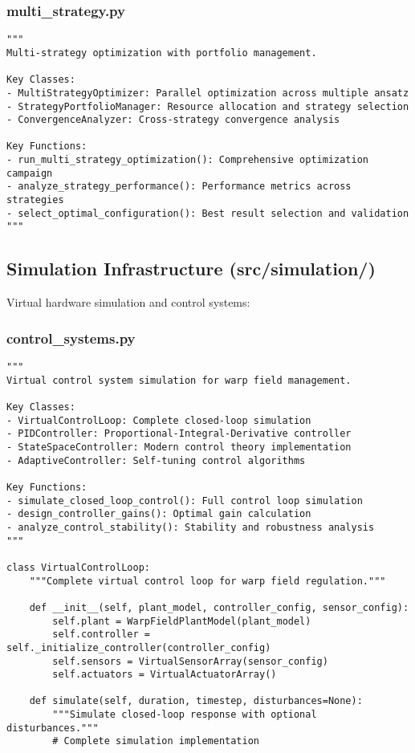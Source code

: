 \documentclass{article}
\begin{document}
\subsubsection{multi\_strategy.py}
\begin{lstlisting}
"""
Multi-strategy optimization with portfolio management.

Key Classes:
- MultiStrategyOptimizer: Parallel optimization across multiple ansatz
- StrategyPortfolioManager: Resource allocation and strategy selection
- ConvergenceAnalyzer: Cross-strategy convergence analysis

Key Functions:
- run_multi_strategy_optimization(): Comprehensive optimization campaign
- analyze_strategy_performance(): Performance metrics across strategies
- select_optimal_configuration(): Best result selection and validation
"""
\end{lstlisting}

\subsection{Simulation Infrastructure (src/simulation/)}

Virtual hardware simulation and control systems:

\subsubsection{control\_systems.py}
\begin{lstlisting}
"""
Virtual control system simulation for warp field management.

Key Classes:
- VirtualControlLoop: Complete closed-loop simulation
- PIDController: Proportional-Integral-Derivative controller
- StateSpaceController: Modern control theory implementation
- AdaptiveController: Self-tuning control algorithms

Key Functions:
- simulate_closed_loop_control(): Full control loop simulation
- design_controller_gains(): Optimal gain calculation
- analyze_control_stability(): Stability and robustness analysis
"""

class VirtualControlLoop:
    """Complete virtual control loop for warp field regulation."""
    
    def __init__(self, plant_model, controller_config, sensor_config):
        self.plant = WarpFieldPlantModel(plant_model)
        self.controller = self._initialize_controller(controller_config)
        self.sensors = VirtualSensorArray(sensor_config)
        self.actuators = VirtualActuatorArray()
    
    def simulate(self, duration, timestep, disturbances=None):
        """Simulate closed-loop response with optional disturbances."""
        # Complete simulation implementation
\end{lstlisting}
\end{document}
